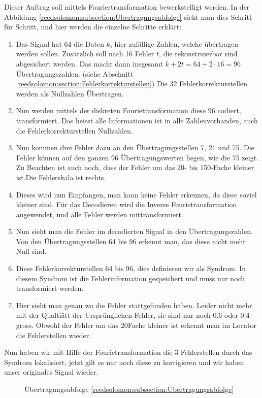 Dieser Auftrag soll mittels Fouriertransformation bewerkstelligt werden.
In der Abbildung \ref{reedsolomon:subsection:Übertragungsabfolge} sieht man dies Schritt für Schritt,
und hier werden die einzelne Schritte erklärt:
\begin{enumerate}[(1)]
 \item Das Signal hat 64 die Daten $k$, hier zufällige Zahlen, welche übertragen werden sollen. 
 Zusätzlich soll nach 16 Fehler $t$, die rekonstruierbar sind abgesichert werden.
 Das macht dann insgesamt $k + 2t = 
 64 +2 \cdot 16= 96$ Übertragungszahlen.
 (siehe Abschnitt \ref{reedsolomon:section:Fehlerkorrekturstellen})
 Die 32 Fehlerkorrekturstellen werden als Nullzahlen Übertragen.
 \item Nun werden mittels der diskreten Fourietransformation diese 96 codiert, transformiert.
 Das heisst alle Informationen ist in alle Zahlenvorhanden, auch die Fehlerkorrekturstellen Nullzahlen.
 \item Nun kommen drei Fehler dazu an den Übertragungsstellen 7, 21 und 75.
 Die Fehler können auf den ganzen 96 Übertragungswerten liegen, wie die 75 zeigt.
Zu Beachten ist auch noch, dass der Fehler um das 20- bis 150-Fache kleiner ist.Die Fehlerskala ist rechts.
 \item Dieses wird nun Empfangen, man kann keine Fehler erkennen, da diese soviel kleiner sind.
 Für das Decodieren wird die Inverse Fourietransformation angewendet, und alle Fehler werden mittransformiert.
 \item Nun sieht man die Fehler im decodierten Signal in den Übertragungszahlen. 
 Von den Übertragungsstellen 64 bis 96 erkennt man, das diese nicht mehr Null sind.
 \item Diese Fehlerkorrekturstellen 64 bis 96, dies definieren wir als Syndrom.
 In diesem Syndrom ist die Fehlerinformation gespeichert und muss nur noch transformiert werden.
 \item Hier sieht man genau wo die Fehler stattgefunden haben. 
 Leider nicht mehr mit der Qualtiätt der Ursprünglichen Fehler, sie sind nur noch 0.6 oder 0.4 gross.
 Obwohl der Fehler um das 20Fache kleiner ist erkennt man im Locator die Fehlerstellen wieder.
 \end{enumerate}
 Nun haben wir mit Hilfe der Fourietransformation die 3 Fehlerstellen durch das Syndrom lokalisiert, 
 jetzt gilt es nur noch diese zu korrigieren und wir haben unser originales Signal wieder.
\begin{figure}
	\centering
	\resizebox{1.1\textwidth}{!}{
    
	}
	\caption{Übertragungsabfolge \ref{reedsolomon:subsection:Übertragungsabfolge}}
	\label{fig:sendorder}
\end{figure}

